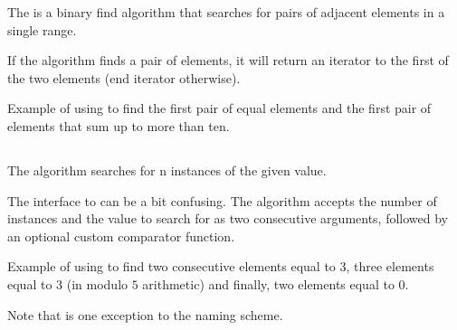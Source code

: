 The  is a binary find algorithm that searches for pairs of adjacent elements in a single range.


If the algorithm finds a pair of elements, it will return an iterator to the first of the two elements (end iterator otherwise).

\begin{box-note}
\footnotesize Example of using  to find the first pair of equal elements and the first pair of elements that sum up to more than ten.
\tcblower
{}
\end{box-note}

\subsection{\texorpdfstring{}{\texttt{std::search\_n}}}

The  algorithm searches for n instances of the given value.


The interface to  can be a bit confusing. The algorithm accepts the number of instances and the value to search for as two consecutive arguments, followed by an optional custom comparator function.

\begin{box-note}
\footnotesize Example of using  to find two consecutive elements equal to $3$, three elements equal to $3$ (in modulo $5$ arithmetic) and finally, two elements equal to $0$.
\tcblower
{}
\end{box-note}

Note that  is one exception to the  naming scheme.

\subsection{\texorpdfstring{}{\texttt{std::find\_first\_of}}}

